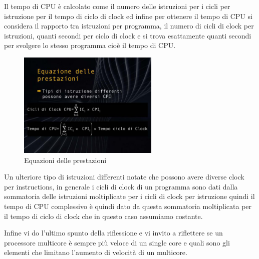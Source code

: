 Il tempo di CPU è calcolato come il numero delle istruzioni per i cicli per istruzione per il tempo di ciclo di clock ed infine per ottenere il tempo di CPU si considera il rapporto tra istruzioni per programma, il numero di cicli di clock per istruzioni, quanti secondi per ciclo di clock e si trova esattamente quanti secondi per svolgere lo stesso programma cioè il tempo di CPU.

\FloatBarrier
\begin{figure}[H]
  \centering
  \includegraphics[width=0.60\textwidth,
                    trim=10 40 10 40, %
                    clip]
                    {images/Lez03_p04_fig_05.png}
  \caption{Equazioni delle prestazioni}
  \label{fig:Lez03_p04_fig_05}
\end{figure}
\FloatBarrier
\noindent

Un ulteriore tipo di istruzioni differenti notate che possono avere diverse clock per instructions, in generale i cicli di clock di un programma sono dati dalla sommatoria delle istruzioni moltiplicate per i cicli di clock per istruzione quindi il tempo di CPU complessivo è quindi dato da questa sommatoria moltiplicata per il tempo di ciclo di clock che in questo caso assumiamo costante.

Infine vi do l'ultimo spunto della riflessione e vi invito a riflettere se un processore multicore è sempre più veloce di un single core e quali sono gli elementi che limitano l'aumento di velocità di un multicore.